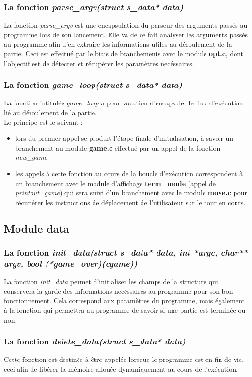 \documentclass{report}
\begin{document}
\subsubsection*{La fonction \textit{parse\_argv(struct s\_data* data)}}
La fonction \textit{parse\_argv} est une encapsulation du parseur des arguments passés au programme lors de son lancement.
Elle va de ce fait analyser les arguments passés au programme afin d'en extraire les informations utiles au déroulement de la partie.
Ceci est effectué par le biais de branchements avec le module \textbf{opt.c}, dont l'objectif est de détecter et récupérer les paramètres necéssaires.
\subsubsection*{La fonction \textit{game\_loop(struct s\_data* data)}}
La fonction intitulée \textit{game\_loop} a pour vocation d'encapsuler le flux d'exécution lié au déroulement de la partie.\\
Le principe est le suivant :
\begin{itemize}
\item lors du premier appel se produit l'étape finale d'initialisation, à savoir un branchement au module \textbf{game.c} effectué par un appel de la fonction \textit{new\_game}
\item les appels à cette fonction au cours de la boucle d'exécution correspondent à un branchement avec le module d'affichage \textbf{term\_mode} (appel de \textit{printout\_game}) qui sera suivi d'un branchement avec le module \textbf{move.c} pour récupérer les instructions de déplacement de l'utilisateur sur le tour en cours.
\end{itemize}

\subsection{Module data}
\subsubsection*{La fonction \textit{init\_data(struct s\_data* data, int *argc, char** argv, bool (*game\_over)(cgame))}}
La fonction \textit{init\_data} permet d'initialiser les champs de la structure qui conservera la garde des informations necéssaires au programme pour son bon fonctionnement.
Cela correspond aux paramètres du programme, mais également à la fonction qui permettra au programme de savoir si une partie est terminée ou non.
\subsubsection*{La fonction \textit{delete\_data(struct s\_data* data)}}
Cette fonction est destinée à être appelée lorsque le programme est en fin de vie, ceci afin de libérer la mémoire allouée dynamiquement au cours de l'exécution.
\end{document}
